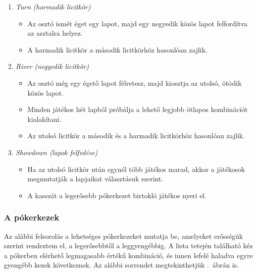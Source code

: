 \documentclass[]{thesis-ekf}
\theoremstyle{definition}
\theoremstyle{remark}
\begin{document}
\begin{enumerate}
\begin{itemize}
	\end{itemize}
	\item \emph{Turn (harmadik licitkör)}
	\begin{itemize}
		\item Az osztó ismét éget egy lapot, majd egy negyedik közös lapot felfordítva az asztalra helyez.
		\item A harmadik licitkör a második licitkörhöz hasonlóan zajlik.
	\end{itemize}
	\item \emph{River (negyedik licitkör)}
	\begin{itemize}
		\item Az osztó még egy égető lapot félretesz, majd kiosztja az utolsó, ötödik közös lapot.
		\item Minden játékos hét lapból próbálja a lehető legjobb ötlapos kombinációt kialakítani.
		\item Az utolsó licitkör a második és a harmadik licitkörhöz hasonlóan zajlik.
	\end{itemize}
	\item \emph{Showdown (lapok felfedése)}
	\begin{itemize}
		\item Ha az utolsó licitkör után egynél több játékos marad, akkor a játékosok megmutatják a lapjaikat választásuk szerint.
		\item A kasszát a legerősebb pókerkezet birtokló játékos nyeri el.
	\end{itemize}
\end{enumerate}

\subsubsection{A pókerkezek \cite[9.~oldal]{Szurdi}}

Az alábbi felsorolás a lehetséges pókerkezeket mutatja be, amelyeket erősségük szerint rendeztem el, a legerősebbtől a leggyengébbig. A lista tetején található kéz a pókerben elérhető legmagasabb értékű kombináció, és innen lefelé haladva egyre gyengébb kezek következnek. Az alábbi sorrendet megtekinthetjük .~ábrán is. 
\end{document}
